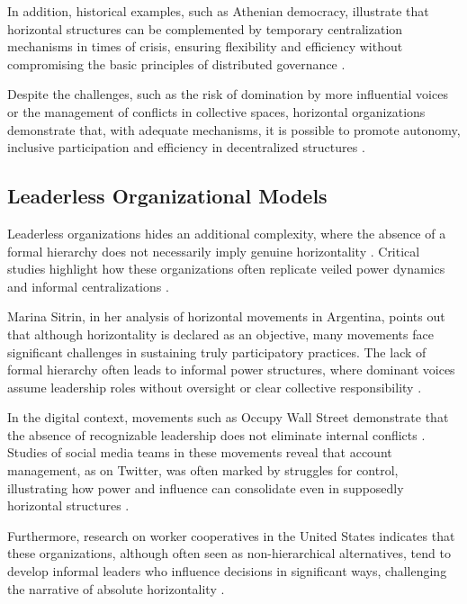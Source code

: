 In addition, historical examples, such as Athenian democracy, illustrate that
horizontal structures can be complemented by temporary centralization mechanisms
in times of crisis, ensuring flexibility and efficiency without compromising the
basic principles of distributed governance \cite{AthenianDemocracyABrief}.

Despite the challenges, such as the risk of domination by more influential
voices or the management of conflicts in collective spaces, horizontal
organizations demonstrate that, with adequate mechanisms, it is possible to
promote autonomy, inclusive participation and efficiency in decentralized
structures \cite{SocialMediaTeamsAsDigitalVanguards}.

\subsection{Leaderless Organizational Models}
\label{subsec:leaderless_organizational_models}

Leaderless organizations hides an additional complexity, where
the absence of a formal hierarchy does not necessarily imply genuine
horizontality \cite{SocialMediaTeamsAsDigitalVanguards}. Critical studies
highlight how these organizations often replicate veiled power dynamics and
informal centralizations \cite{SocialMediaTeamsAsDigitalVanguards,
EverydayRevolutions}.

Marina Sitrin, in her analysis of horizontal movements in Argentina, points out
that although horizontality is declared as an objective, many movements face
significant challenges in sustaining truly participatory practices. The lack of
formal hierarchy often leads to informal power structures, where dominant voices
assume leadership roles without oversight or clear collective responsibility
\cite{EverydayRevolutions}.

In the digital context, movements such as Occupy Wall Street demonstrate that
the absence of recognizable leadership does not eliminate internal conflicts
\cite{SocialMediaTeamsAsDigitalVanguards}. Studies of social media teams in
these movements reveal that account management, as on Twitter, was often marked
by struggles for control, illustrating how power and influence can consolidate
even in supposedly horizontal structures
\cite{SocialMediaTeamsAsDigitalVanguards}.

Furthermore, research on worker cooperatives in the United States indicates that
these organizations, although often seen as non-hierarchical alternatives, tend
to develop informal leaders who influence decisions in significant ways,
challenging the narrative of absolute horizontality
\cite{WorkerCooperativesandRevolution}.


